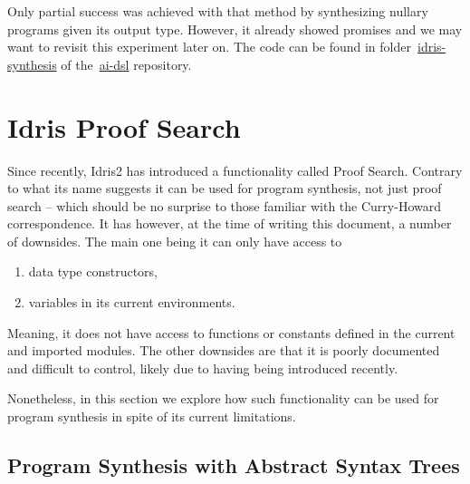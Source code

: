 \documentclass[]{report}
\begin{document}
Only partial success was achieved with that method by synthesizing
nullary programs given its output type.  However, it already showed
promises and we may want to revisit this experiment later on.  The
code can be found in
folder~\href{https://github.com/singnet/ai-dsl/blob/master/experimental/program-synthesis/idris-synthesis}{idris-synthesis}
of the~\href{https://github.com/singnet/ai-dsl}{ai-dsl} repository.

\section{Idris Proof Search}
\label{sec:idris-proof-search}

Since recently, Idris2 has introduced a functionality called Proof
Search.  Contrary to what its name suggests it can be used for program
synthesis, not just proof search -- which should be no surprise to
those familiar with the Curry-Howard correspondence.  It has however,
at the time of writing this document, a number of downsides.  The main
one being it can only have access to
\begin{enumerate}
\item data type constructors,
\item variables in its current environments.
\end{enumerate}
Meaning, it does not have access to functions or constants defined in
the current and imported modules.  The other downsides are that it is
poorly documented and difficult to control, likely due to having being
introduced recently.

Nonetheless, in this section we explore how such functionality can be
used for program synthesis in spite of its current limitations.

\subsection{Program Synthesis with Abstract Syntax Trees}
\label{subsec:AST}
\end{document}
